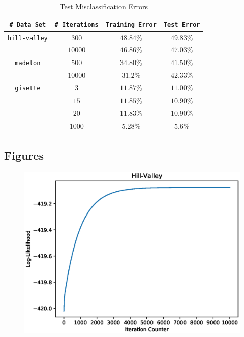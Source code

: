 \documentclass[UTF8]{article}
\begin{document}
\begin{table}[H]
\centering
    \caption{Test Misclassification Errors}
    \begin{tabular}{|c|c|c|c|}
        \hline
        \texttt{\# Data Set} & \multicolumn{1}{|c|}{\texttt{\# Iterations}} & \multicolumn{1}{|c|}{\texttt{Training Error}} & \texttt{Test Error}\\\hline
        \texttt{hill-valley} & $300$ & $48.84\%$ & $49.83\%$ \\\cline{2-4}
         & $10000$ & $46.86\%$ & $47.03\%$ \\\hline\cline{1-4}

        \texttt{madelon} & $500$ & $34.80\%$ & $41.50\%$ \\\cline{2-4}
         & $10000$ & $31.2\%$ & $42.33\%$ \\\hline\cline{1-4}

        \texttt{gisette} & $3$ & $11.87\%$ & $11.00\%$ \\\cline{2-4}
         & $15$ & $11.85\%$ & $10.90\%$ \\\cline{2-4}
         & $20$ & $11.83\%$ & $10.90\%$ \\\cline{2-4}
         & $1000$ & $5.28\%$ & $5.6\%$ \\\hline
    \end{tabular}
\end{table}

\subsection{Figures}
\begin{figure}[H]
    \centering
    \includegraphics[scale=0.90]{./figures/hill-valley_10000_1.eps}
\end{figure}
\end{document}
